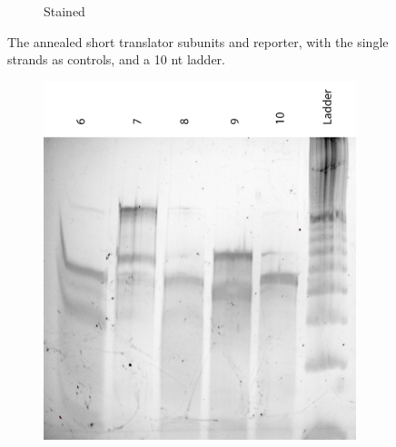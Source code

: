 \begin{figure}[h]
\begin{subfigure}[t]{.5\textwidth}
  \caption{Stained}
  \label{transcription_annealed_stain}
\end{subfigure}
\caption{The annealed short translator subunits and reporter, with the single strands as controls, and a 10 nt ladder.}
\label{transcription_annealed}
\end{figure}

\begin{figure}[h]
\begin{subfigure}[t]{0.51\textwidth}
  \includegraphics[width=\textwidth]{images/translator_transcription_long_1.png}
  \caption{}
  \label{translator_transcription_long_1}
\end{subfigure}
\begin{subfigure}[t]{0.49\textwidth}

\end{subfigure}
\end{figure}
